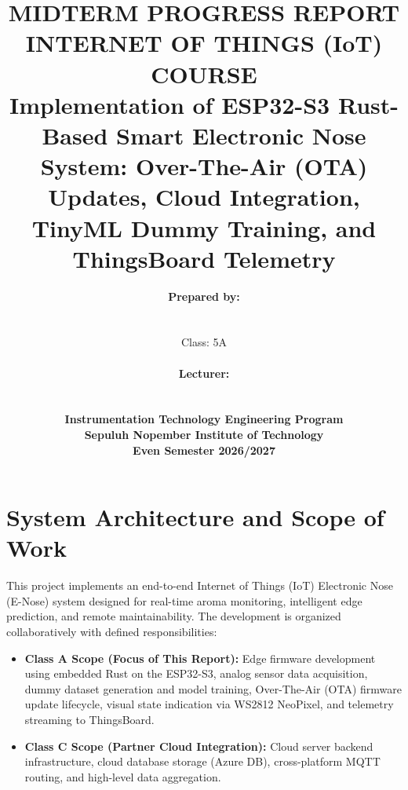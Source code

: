 ﻿\documentclass[12pt,a4paper]{article}
\title{
    \vspace{-2cm}
    \textbf{MIDTERM PROGRESS REPORT}\\
    \textbf{INTERNET OF THINGS (IoT) COURSE}\\
    \vspace{0.5cm}
    \large \textbf{Implementation of ESP32-S3 Rust-Based Smart Electronic Nose System: Over-The-Air (OTA) Updates, Cloud Integration, TinyML Dummy Training, and ThingsBoard Telemetry}
}
\author{
    \textbf{Prepared by:}\\
    \text{Zhafran Ahmed Luxmahdy (NRP: 2042241027)}\\
    \text{Rahma Aulia (NRP: 2042241056)}\\
    Class: 5A\\
    \vspace{1cm}\\
    \textbf{Lecturer:}\\
    \text{Ahmad Radhy, S.Si., M.Si}\\
    \vspace{2cm}\\
    \textbf{Instrumentation Technology Engineering Program}\\
    \textbf{Sepuluh Nopember Institute of Technology}\\
    \textbf{Even Semester 2026/2027}
}
\begin{document}
\maketitle
\newpage

\section{System Architecture and Scope of Work}

This project implements an end-to-end Internet of Things (IoT) Electronic Nose (E-Nose) system designed for real-time aroma monitoring, intelligent edge prediction, and remote maintainability. The development is organized collaboratively with defined responsibilities:
\begin{itemize}
    \item \textbf{Class A Scope (Focus of This Report):} Edge firmware development using embedded Rust on the ESP32-S3, analog sensor data acquisition, dummy dataset generation and model training, Over-The-Air (OTA) firmware update lifecycle, visual state indication via WS2812 NeoPixel, and telemetry streaming to ThingsBoard.
    \item \textbf{Class C Scope (Partner Cloud Integration):} Cloud server backend infrastructure, cloud database storage (Azure DB), cross-platform MQTT routing, and high-level data aggregation.
\end{itemize}
\end{document}
